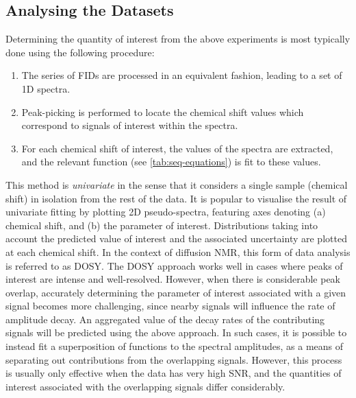 \subsection{Analysing the Datasets}
Determining the quantity of interest from the above experiments is most
typically done using the following procedure:
\begin{enumerate}
    \item The series of \acp{FID} are processed in an equivalent fashion,
        leading to a set of \ac{1D} spectra.
    \item Peak-picking is performed to locate the chemical shift values which
        correspond to signals of interest within the spectra.
    \item For each chemical shift of interest, the values of the spectra are
        extracted, and the relevant function (see
        \cref{tab:seq-equations}) is fit to these values.
\end{enumerate}
This method is \emph{univariate} in the sense that it considers a single sample
(chemical shift) in isolation from the rest of the data.
It is popular to visualise the result of univariate fitting by plotting \ac{2D}
pseudo-spectra, featuring axes denoting (a) chemical shift, and (b)
the parameter of interest. Distributions taking
into account the predicted value of interest and the associated uncertainty
are plotted at each chemical shift.
In the context of diffusion \ac{NMR}, this form of data analysis is
referred to as \ac{DOSY}\cite{Morris2009b}.
The \ac{DOSY} approach works well in cases where peaks of interest are intense
and well-resolved. However, when there is considerable peak overlap, accurately
determining the parameter of interest associated with a given signal becomes
more challenging, since nearby signals will influence the rate of amplitude
decay. An aggregated value of the decay rates of the contributing signals
will be predicted using the above approach.
In such cases, it is possible to instead fit
a superposition of functions to the spectral amplitudes, as a means of
separating out contributions from the overlapping signals\cite{Nilsson2006}.
However, this process is usually only effective when the data has very high
\ac{SNR}, and the quantities of interest associated with the overlapping
signals differ considerably.

